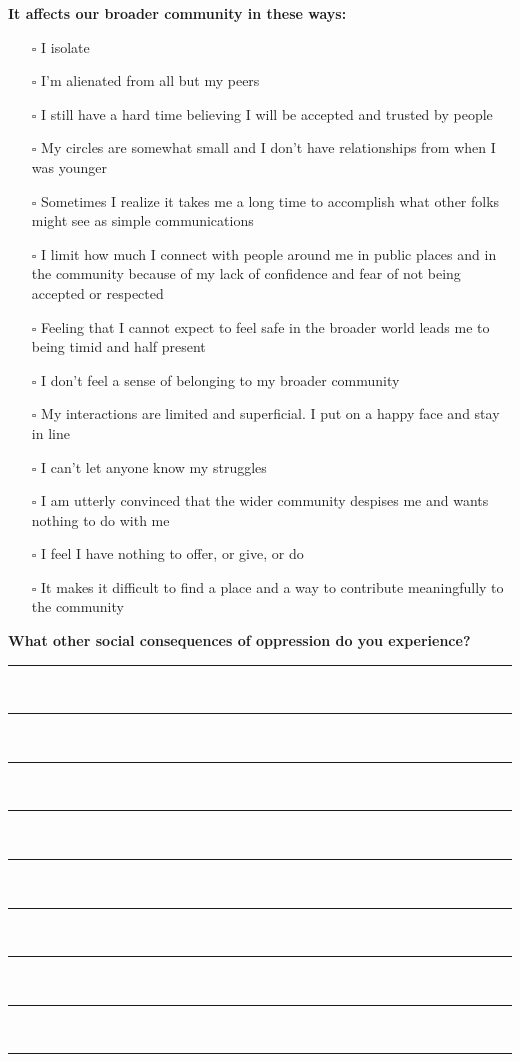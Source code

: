 \newpage
\textbf{\large{It affects our broader community in these ways:}}
\begin{multicols}{2}
\begin{itemize}
\item[$\square$]{I isolate}
\item[$\square$]{I’m alienated from all but my peers}
\item[$\square$]{I still have a hard time believing I will be accepted and trusted by people }
\item[$\square$]{My circles are somewhat small and I don’t have relationships from when I was younger }
\item[$\square$]{Sometimes I realize it takes me a long time to accomplish what other folks might see as simple communications}
\item[$\square$]{I limit how much I connect with people around me in public places and in the community because of my lack of confidence and fear of not being accepted or respected}
\item[$\square$]{Feeling that I cannot expect to feel safe in the broader world leads me to being timid and half present}
\item[$\square$]{I don’t feel a sense of belonging to my broader community}
\item[$\square$]{My interactions are limited and superficial. I put on a happy face and stay in line}
\item[$\square$]{I can’t let anyone know my struggles}
\item[$\square$]{I am utterly convinced that the wider community despises me and wants nothing to do with me}
\item[$\square$]{I feel I have nothing to offer, or give, or do}
\item[$\square$]{It makes it difficult to find a place and a way to contribute meaningfully to the community}
\end{itemize}
\end{multicols}

\noindent
\textcolor{ProcessBlue}{\textbf{\Large{What other social consequences of oppression do you experience?}}}\\
\noindent\rule{\textwidth}{1pt}\\
\noindent\rule{\textwidth}{1pt}\\
\noindent\rule{\textwidth}{1pt}\\
\noindent\rule{\textwidth}{1pt}\\
\noindent\rule{\textwidth}{1pt}\\
\noindent\rule{\textwidth}{1pt}\\
\noindent\rule{\textwidth}{1pt}\\
\noindent\rule{\textwidth}{1pt}\\
\noindent\rule{\textwidth}{1pt}\\\\


